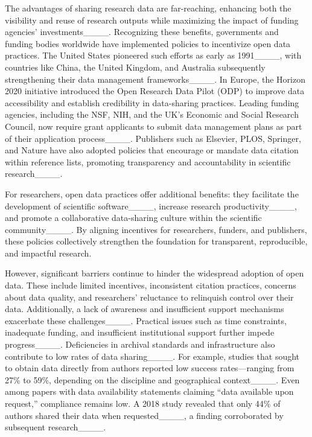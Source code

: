 The advantages of sharing research data are far-reaching, enhancing both the visibility and reuse of research outputs while maximizing the impact of funding agencies' investments____. Recognizing these benefits, governments and funding bodies worldwide have implemented policies to incentivize open data practices. The United States pioneered such efforts as early as 1991____, with countries like China, the United Kingdom, and Australia subsequently strengthening their data management frameworks____. In Europe, the Horizon 2020 initiative introduced the Open Research Data Pilot (ODP) to improve data accessibility and establish credibility in data-sharing practices. Leading funding agencies, including the NSF, NIH, and the UK’s Economic and Social Research Council, now require grant applicants to submit data management plans as part of their application process____. Publishers such as Elsevier, PLOS, Springer, and Nature have also adopted policies that encourage or mandate data citation within reference lists, promoting transparency and accountability in scientific research____.

For researchers, open data practices offer additional benefits: they facilitate the development of scientific software____, increase research productivity____, and promote a collaborative data-sharing culture within the scientific community____. By aligning incentives for researchers, funders, and publishers, these policies collectively strengthen the foundation for transparent, reproducible, and impactful research.


However, significant barriers continue to hinder the widespread adoption of open data. These include limited incentives, inconsistent citation practices, concerns about data quality, and researchers' reluctance to relinquish control over their data. Additionally, a lack of awareness and insufficient support mechanisms exacerbate these challenges____. Practical issues such as time constraints, inadequate funding, and insufficient institutional support further impede progress____. Deficiencies in archival standards and infrastructure also contribute to low rates of data sharing____. For example, studies that sought to obtain data directly from authors reported low success rates—ranging from 27\% to 59\%, depending on the discipline and geographical context____. Even among papers with data availability statements claiming “data available upon request,” compliance remains low. A 2018 study revealed that only 44\% of authors shared their data when requested____, a finding corroborated by subsequent research____. 

